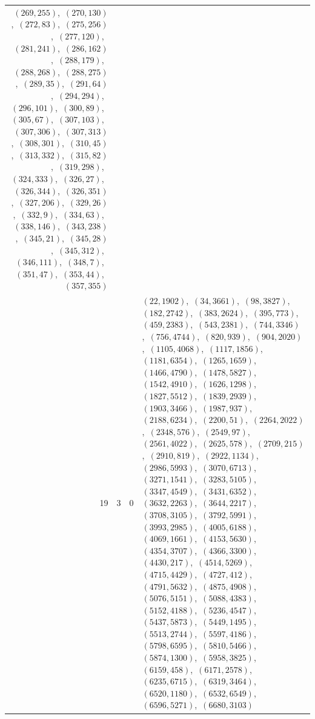 \documentclass[11pt]{article}
\begin{document}
\begin{longtable}{@{}rrl>{\raggedright\arraybackslash}p{}@{}}
$(269,255)$,\allowbreak\ $(270,130)$,\allowbreak\ $(272,83)$,\allowbreak\ $(275,256)$,\allowbreak\ $(277,120)$,\allowbreak\ $(281,241)$,\allowbreak\ $(286,162)$,\allowbreak\ $(288,179)$,\allowbreak\ $(288,268)$,\allowbreak\ $(288,275)$,\allowbreak\ $(289,35)$,\allowbreak\ $(291,64)$,\allowbreak\ $(294,294)$,\allowbreak\ $(296,101)$,\allowbreak\ $(300,89)$,\allowbreak\ $(305,67)$,\allowbreak\ $(307,103)$,\allowbreak\ $(307,306)$,\allowbreak\ $(307,313)$,\allowbreak\ $(308,301)$,\allowbreak\ $(310,45)$,\allowbreak\ $(313,332)$,\allowbreak\ $(315,82)$,\allowbreak\ $(319,298)$,\allowbreak\ $(324,333)$,\allowbreak\ $(326,27)$,\allowbreak\ $(326,344)$,\allowbreak\ $(326,351)$,\allowbreak\ $(327,206)$,\allowbreak\ $(329,26)$,\allowbreak\ $(332,9)$,\allowbreak\ $(334,63)$,\allowbreak\ $(338,146)$,\allowbreak\ $(343,238)$,\allowbreak\ $(345,21)$,\allowbreak\ $(345,28)$,\allowbreak\ $(345,312)$,\allowbreak\ $(346,111)$,\allowbreak\ $(348,7)$,\allowbreak\ $(351,47)$,\allowbreak\ $(353,44)$,\allowbreak\ $(357,355)$\\
19 & 3 & $0$ & $(22,1902)$,\allowbreak\ $(34,3661)$,\allowbreak\ $(98,3827)$,\allowbreak\ $(182,2742)$,\allowbreak\ $(383,2624)$,\allowbreak\ $(395,773)$,\allowbreak\ $(459,2383)$,\allowbreak\ $(543,2381)$,\allowbreak\ $(744,3346)$,\allowbreak\ $(756,4744)$,\allowbreak\ $(820,939)$,\allowbreak\ $(904,2020)$,\allowbreak\ $(1105,4068)$,\allowbreak\ $(1117,1856)$,\allowbreak\ $(1181,6354)$,\allowbreak\ $(1265,1659)$,\allowbreak\ $(1466,4790)$,\allowbreak\ $(1478,5827)$,\allowbreak\ $(1542,4910)$,\allowbreak\ $(1626,1298)$,\allowbreak\ $(1827,5512)$,\allowbreak\ $(1839,2939)$,\allowbreak\ $(1903,3466)$,\allowbreak\ $(1987,937)$,\allowbreak\ $(2188,6234)$,\allowbreak\ $(2200,51)$,\allowbreak\ $(2264,2022)$,\allowbreak\ $(2348,576)$,\allowbreak\ $(2549,97)$,\allowbreak\ $(2561,4022)$,\allowbreak\ $(2625,578)$,\allowbreak\ $(2709,215)$,\allowbreak\ $(2910,819)$,\allowbreak\ $(2922,1134)$,\allowbreak\ $(2986,5993)$,\allowbreak\ $(3070,6713)$,\allowbreak\ $(3271,1541)$,\allowbreak\ $(3283,5105)$,\allowbreak\ $(3347,4549)$,\allowbreak\ $(3431,6352)$,\allowbreak\ $(3632,2263)$,\allowbreak\ $(3644,2217)$,\allowbreak\ $(3708,3105)$,\allowbreak\ $(3792,5991)$,\allowbreak\ $(3993,2985)$,\allowbreak\ $(4005,6188)$,\allowbreak\ $(4069,1661)$,\allowbreak\ $(4153,5630)$,\allowbreak\ $(4354,3707)$,\allowbreak\ $(4366,3300)$,\allowbreak\ $(4430,217)$,\allowbreak\ $(4514,5269)$,\allowbreak\ $(4715,4429)$,\allowbreak\ $(4727,412)$,\allowbreak\ $(4791,5632)$,\allowbreak\ $(4875,4908)$,\allowbreak\ $(5076,5151)$,\allowbreak\ $(5088,4383)$,\allowbreak\ $(5152,4188)$,\allowbreak\ $(5236,4547)$,\allowbreak\ $(5437,5873)$,\allowbreak\ $(5449,1495)$,\allowbreak\ $(5513,2744)$,\allowbreak\ $(5597,4186)$,\allowbreak\ $(5798,6595)$,\allowbreak\ $(5810,5466)$,\allowbreak\ $(5874,1300)$,\allowbreak\ $(5958,3825)$,\allowbreak\ $(6159,458)$,\allowbreak\ $(6171,2578)$,\allowbreak\ $(6235,6715)$,\allowbreak\ $(6319,3464)$,\allowbreak\ $(6520,1180)$,\allowbreak\ $(6532,6549)$,\allowbreak\ $(6596,5271)$,\allowbreak\ $(6680,3103)$\\

\end{longtable}
\end{document}
